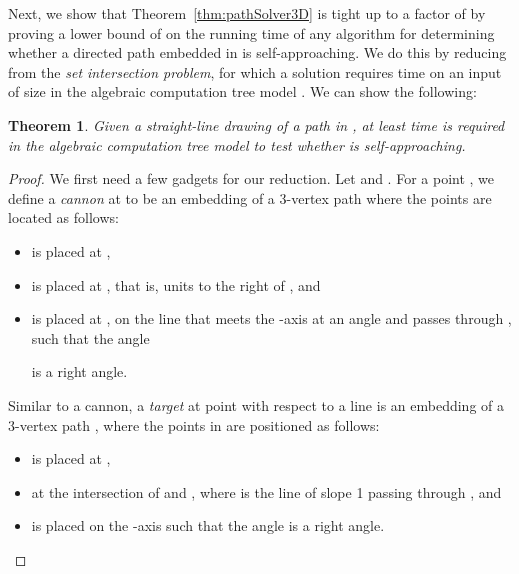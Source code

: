 \documentclass[11pt]{article}
\newtheorem{theorem}{Theorem}
\newcommand{\changedagain}[1]{{#1}}
\begin{document}
Next, we show that Theorem~\ref{thm:pathSolver3D} is tight up to a factor of  by proving a lower bound of  on the running time of any algorithm for determining whether a directed path embedded in  is self-approaching.  We do this by reducing from the \emph{set intersection problem}, for which a solution requires  time on an input of size  in the algebraic computation tree model \cite{Ben83}.  We can show the following:
\begin{theorem}
\label{thm:hardnesspath}
Given a straight-line drawing of a path  in , at least  time is required in the algebraic computation tree model to test whether  is self-approaching.
\end{theorem}
\begin{proof}
We first need a few gadgets for our reduction. Let  and .  For a point , we define a \emph{cannon}  at  to be an embedding of a 3-vertex path  where the points are located as follows:
\begin{itemize}
\item  is placed at ,
\item  is placed at , that is,  units to the right of , and
\item  is placed at , on the line that meets the -axis at an angle  and passes through , such that the angle

is a right angle.
\end{itemize}
Similar to a cannon, a \emph{target}  at point  with respect to \changedagain{a line}  is an embedding of a 3-vertex path , where the points in  are positioned as follows:
\begin{itemize}
\item  is placed at ,
\item  at the intersection of  and , where  is the line of slope 1 passing through , and
\item  is placed on the -axis such that the angle
   is a right angle.
\end{itemize}


\end{proof}
\end{document}
